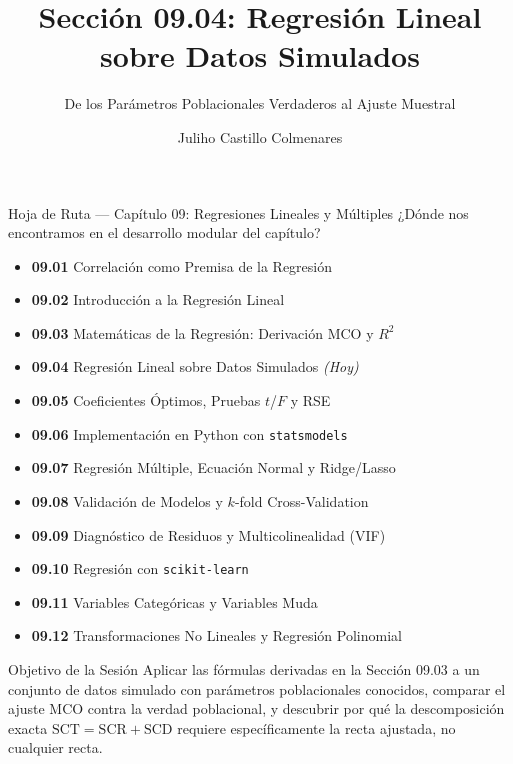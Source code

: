 \documentclass[10pt, aspectratio=169]{beamer}
\title[Regresión sobre Datos Simulados]{Sección 09.04: Regresión Lineal sobre Datos Simulados}
\subtitle{De los Parámetros Poblacionales Verdaderos al Ajuste Muestral}
\author[J. Castillo Colmenares]{Juliho Castillo Colmenares}
\institute{Tecnológico de Monterrey}
\date{\vspace{-1.2cm}}
\begin{document}
\begin{frame}[plain]
  \vspace{-0.8cm}
  \titlepage
\end{frame}

\begin{frame}{Hoja de Ruta --- Capítulo 09: Regresiones Lineales y Múltiples}
  \scriptsize
  ¿Dónde nos encontramos en el desarrollo modular del capítulo?
  \begin{itemize}\itemsep=0.02em
    \item \textbf{09.01} Correlación como Premisa de la Regresión
    \item \textbf{09.02} Introducción a la Regresión Lineal
    \item \textbf{09.03} Matemáticas de la Regresión: Derivación MCO y $R^2$
    \item \textbf{09.04} Regresión Lineal sobre Datos Simulados \emph{(Hoy)}
    \item \textbf{09.05} Coeficientes Óptimos, Pruebas $t$/$F$ y RSE
    \item \textbf{09.06} Implementación en Python con \texttt{statsmodels}
    \item \textbf{09.07} Regresión Múltiple, Ecuación Normal y Ridge/Lasso
    \item \textbf{09.08} Validación de Modelos y $k$-fold Cross-Validation
    \item \textbf{09.09} Diagnóstico de Residuos y Multicolinealidad (VIF)
    \item \textbf{09.10} Regresión con \texttt{scikit-learn}
    \item \textbf{09.11} Variables Categóricas y Variables Muda
    \item \textbf{09.12} Transformaciones No Lineales y Regresión Polinomial
  \end{itemize}
  \pause
  \vspace{-0.05cm}
  \begin{block}{Objetivo de la Sesión}
    Aplicar las fórmulas derivadas en la Sección 09.03 a un conjunto de datos simulado con parámetros poblacionales conocidos, comparar el ajuste MCO contra la verdad poblacional, y descubrir por qué la descomposición exacta $\text{SCT}=\text{SCR}+\text{SCD}$ requiere específicamente la recta ajustada, no cualquier recta.
  \end{block}
\end{frame}
\end{document}
